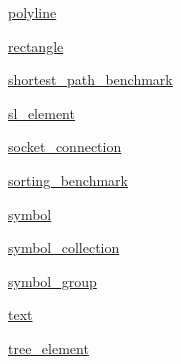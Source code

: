 \begin{DoxyCompactItemize}
 \hyperlink{namespacebridges_1_1polyline}{polyline}
\item 
 \hyperlink{namespacebridges_1_1rectangle}{rectangle}
\item 
 \hyperlink{namespacebridges_1_1shortest__path__benchmark}{shortest\+\_\+path\+\_\+benchmark}
\item 
 \hyperlink{namespacebridges_1_1sl__element}{sl\+\_\+element}
\item 
 \hyperlink{namespacebridges_1_1socket__connection}{socket\+\_\+connection}
\item 
 \hyperlink{namespacebridges_1_1sorting__benchmark}{sorting\+\_\+benchmark}
\item 
 \hyperlink{namespacebridges_1_1symbol}{symbol}
\item 
 \hyperlink{namespacebridges_1_1symbol__collection}{symbol\+\_\+collection}
\item 
 \hyperlink{namespacebridges_1_1symbol__group}{symbol\+\_\+group}
\item 
 \hyperlink{namespacebridges_1_1text}{text}
\item 
 \hyperlink{namespacebridges_1_1tree__element}{tree\+\_\+element}
\end{DoxyCompactItemize}
